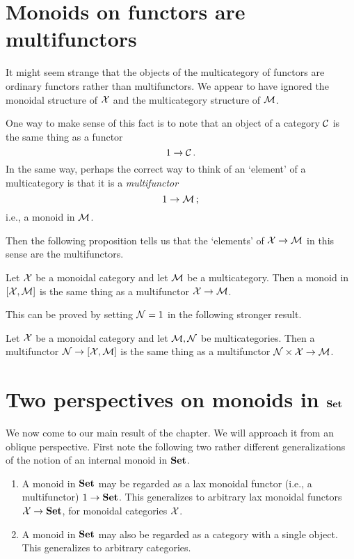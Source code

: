 \section{Monoids on functors are multifunctors}
It might seem strange that the objects of the multicategory of functors are ordinary functors rather than multifunctors.  
We appear to have ignored the monoidal structure of $\mathcal X$ and the multicategory structure of $\mathcal M$.  

One way to make sense of this fact is to note that an object of a category ${\mathcal{C}}$ is the same thing as a functor
\[
  1 \to {\mathcal{C}}\,.
  \]
In the same way, perhaps the correct way to think of an `element' of a multicategory is that it is a \emph{multifunctor}
\[
  1 \to \mathcal M\,;
  \]
i.e., a monoid in $\mathcal M$.

Then the following proposition tells us that the `elements' of $\mathcal X \to \mathcal M$ in this sense are the multifunctors.

\begin{proposition}
  Let $\mathcal X$ be a monoidal category and let $\mathcal M$ be a multicategory.  
  Then a monoid in $[\mathcal X,\mathcal M]$ is the same thing as a multifunctor $\mathcal X \to \mathcal M$.
  \label{PropMonoidInXMIsMultifunctorXToM}
\end{proposition}

This can be proved by setting $\mathcal N=1$ in the following stronger result.

\begin{proposition}
  Let $\mathcal X$ be a monoidal category and let $\mathcal M,\mathcal N$ be multicategories.  
  \label{PropPisani}
  Then a multifunctor $\mathcal N \to [\mathcal X,\mathcal M]$ is the same thing as a multifunctor $\mathcal N\times\mathcal X \to \mathcal M$.
\end{proposition}

\section{Two perspectives on monoids in ${\normalfont\textbf{Set}}$}

We now come to our main result of the chapter.  
We will approach it from an oblique perspective.  
First note the following two rather different generalizations of the notion of an internal monoid in ${\normalfont\textbf{Set}}$.

\begin{enumerate}
  \item A monoid in ${\normalfont\textbf{Set}}$ may be regarded as a lax monoidal functor (i.e., a multifunctor) $1 \to {\normalfont\textbf{Set}}$.  
    This generalizes to arbitrary lax monoidal functors $\mathcal X \to {\normalfont\textbf{Set}}$, for monoidal categories $\mathcal X$.
  \item A monoid in ${\normalfont\textbf{Set}}$ may also be regarded as a category with a single object.  
    This generalizes to arbitrary categories.
\end{enumerate}

